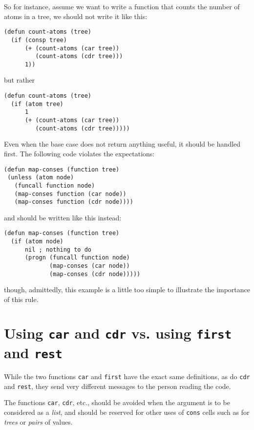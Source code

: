 So for instance, assume we want to write a function that counts
the number of atoms in a tree, we should not write it like this:

\begin{verbatim}
(defun count-atoms (tree)
  (if (consp tree)
      (+ (count-atoms (car tree))
         (count-atoms (cdr tree)))
      1))
\end{verbatim}

but rather

\begin{verbatim}
(defun count-atoms (tree)
  (if (atom tree)
      1
      (+ (count-atoms (car tree))
         (count-atoms (cdr tree)))))
\end{verbatim}

Even when the base case does not return anything useful, it should be
handled first.  The following code violates the expectations:

\begin{verbatim}
(defun map-conses (function tree)
 (unless (atom node)
   (funcall function node)
   (map-conses function (car node))
   (map-conses function (cdr node))))
\end{verbatim}

and should be written like this instead:

\begin{verbatim}
(defun map-conses (function tree)
  (if (atom node)
      nil ; nothing to do
      (progn (funcall function node)
             (map-conses (car node))
             (map-conses (cdr node)))))
\end{verbatim}

though, admittedly, this example is a little too simple to illustrate
the importance of this rule.

\section{Using \texttt{car} and \texttt{cdr} vs. using \texttt{first}
  and \texttt{rest}}

While the two functions \texttt{car} and \texttt{first} have the exact
same definitions, as do \texttt{cdr} and \texttt{rest}, they send very
different messages to the person reading the code.

The functions \texttt{car}, \texttt{cdr}, etc., should be avoided when
the argument is to be considered as a \emph{list}, and should be
reserved for other uses of \texttt{cons} cells such as for
\emph{trees} or \emph{pairs} of values.


